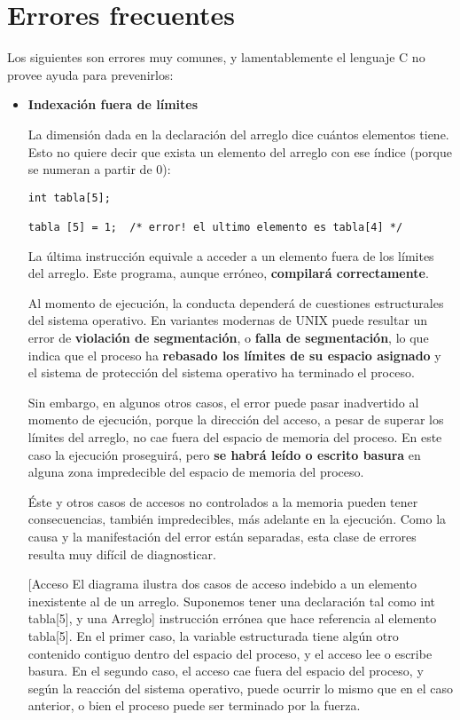 \section{Errores frecuentes}

Los siguientes son errores muy comunes, y lamentablemente el lenguaje C no
provee ayuda para prevenirlos:
\begin{itemize}
\item \textbf{Indexación fuera de límites}
	
La dimensión dada en la declaración del arreglo dice cuántos elementos tiene.
Esto no quiere decir que exista un elemento del arreglo con ese índice (porque
se numeran a partir de 0):
\begin{lstlisting}
int tabla[5];

tabla [5] = 1;	/* error! el ultimo elemento es tabla[4] */
\end{lstlisting}

La última instrucción equivale a acceder a un elemento fuera de los límites del
arreglo. Este programa, aunque erróneo, \textbf{compilará correctamente}. 

Al
momento de ejecución, la conducta dependerá de cuestiones estructurales del
sistema operativo. En variantes modernas de UNIX puede resultar un error de
\textbf{violación de segmentación}, o \textbf{falla de segmentación}, lo que indica que el proceso
ha \textbf{rebasado los límites de su espacio asignado} y el sistema de protección del
sistema operativo ha terminado el proceso.

Sin embargo, en algunos otros casos, el error puede pasar inadvertido al
momento de ejecución, porque la dirección del acceso, a pesar de superar los límites del
arreglo, no cae fuera del espacio de memoria del proceso. En este caso la ejecución
proseguirá, pero \textbf{se habrá leído o escrito basura} en alguna zona impredecible
del espacio de memoria del proceso. 

Éste y otros casos de accesos no controlados a la memoria pueden tener consecuencias, también impredecibles, más adelante en la ejecución. Como la causa y la manifestación del error están separadas, esta clase de errores resulta muy difícil de diagnosticar.

[Acceso  El diagrama ilustra dos casos de acceso indebido a un elemento inexistente
al       de un arreglo. Suponemos tener una declaración tal como int tabla[5], y una
Arreglo] instrucción errónea que hace referencia al elemento tabla[5].
         En el primer caso, la variable estructurada tiene algún otro contenido
         contiguo dentro del espacio del proceso, y el acceso lee o escribe basura.
         En el segundo caso, el acceso cae fuera del espacio del proceso, y según la
         reacción del sistema operativo, puede ocurrir lo mismo que en el caso
         anterior, o bien el proceso puede ser terminado por la fuerza.



\end{itemize}
